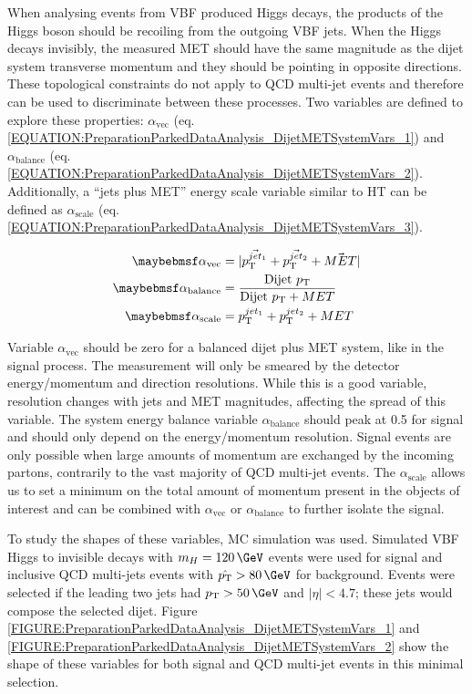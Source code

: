 When analysing events from \gls{VBF} produced Higgs decays, the products of the Higgs boson should be recoiling from the outgoing \gls{VBF} jets. When the Higgs decays invisibly, the measured \gls{MET} should have the same magnitude as the dijet system transverse momentum and they should be pointing in opposite directions. These topological constraints do not apply to \gls{QCD} multi-jet events and therefore can be used to discriminate between these processes. Two variables are defined to explore these properties: $\alpha_{\text{vec}}$ (eq. \ref{EQUATION:PreparationParkedDataAnalysis_DijetMETSystemVars_1}) and $\alpha_{\text{balance}}$ (eq. \ref{EQUATION:PreparationParkedDataAnalysis_DijetMETSystemVars_2}). Additionally, a ``jets plus \gls{MET}'' energy scale variable similar to \gls{HT} can be defined as $\alpha_{\text{scale}}$ (eq. \ref{EQUATION:PreparationParkedDataAnalysis_DijetMETSystemVars_3}).

\begin{align}
\alpha_{\text{vec}}     &= |\vec{\pt^{jet_1}} + \vec{\pt^{jet_2}} + \vec{MET}|
\label{EQUATION:PreparationParkedDataAnalysis_DijetMETSystemVars_1} \\
\alpha_{\text{balance}} &= \frac{\text{Dijet } \pt}{\text{Dijet } \pt + MET} 
\label{EQUATION:PreparationParkedDataAnalysis_DijetMETSystemVars_2} \\
\alpha_{\text{scale}}   &= \pt^{jet_1} + \pt^{jet_2} + MET 
\label{EQUATION:PreparationParkedDataAnalysis_DijetMETSystemVars_3} \\
\end{align}

Variable $\alpha_{\text{vec}}$ should be zero for a balanced dijet plus \gls{MET} system, like in the signal process. The measurement will only be smeared by the detector energy/momentum and direction resolutions. While this is a good variable, resolution changes with jets and \gls{MET} magnitudes, affecting the spread of this variable. The system energy balance variable $\alpha_{\text{balance}}$ should peak at 0.5 for signal and should only depend on the energy/momentum resolution. Signal events are only possible when large amounts of momentum are exchanged by the incoming partons, contrarily to the vast majority of \gls{QCD} multi-jet events. The $\alpha_{\text{scale}}$ allows us to set a minimum on the total amount of momentum present in the objects of interest and can be combined with $\alpha_{\text{vec}}$ or $\alpha_{\text{balance}}$ to further isolate the signal.

To study the shapes of these variables, \gls{MC} simulation was used. Simulated \gls{VBF} Higgs to invisible decays with $m_H=120\,\GeV$ events were used for signal and inclusive \gls{QCD} multi-jets events with $\hat{\pt}>80\,\GeV$ for background. Events were selected if the leading two jets had $\pt>50\,\GeV$ and $|\eta|<4.7$; these jets would compose the selected dijet. Figure \ref{FIGURE:PreparationParkedDataAnalysis_DijetMETSystemVars_1} and \ref{FIGURE:PreparationParkedDataAnalysis_DijetMETSystemVars_2} show the shape of these variables for both signal and \gls{QCD} multi-jet events in this minimal selection.

